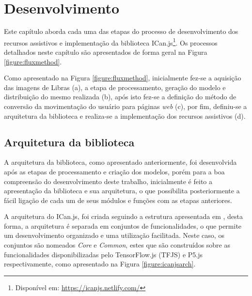 \newpage
\chapter{Desenvolvimento}
\label{ch:desenvolvimento}

\par Este capítulo aborda cada uma das etapas do processo de desenvolvimento dos recursos assistivos e implementação da biblioteca ICan.js\footnote{Disponível em: \url{https://icanjs.netlify.com/}}. Os processos detalhados neste capítulo são apresentados de forma geral na Figura \ref{figure:fluxmethod}.


\par Como apresentado na Figura \ref{figure:fluxmethod}, inicialmente fez-se a aquisição das imagens de Libras (a), a etapa de processamento, geração do modelo e distribuição do mesmo realizada (b), após isto fez-se a definição do método de conversão da movimentação do usuário para páginas \textit{web} (c), por fim, definiu-se a arquitetura da biblioteca e realiza-se a implementação dos recursos assistivos (d).

\section{Arquitetura da biblioteca}

\par A arquitetura da biblioteca, como apresentado anteriormente, foi desenvolvida após as etapas de processamento e criação dos modelos, porém para a boa compreensão do desenvolvimento deste trabalho, inicialmente é feito a apresentação da biblioteca e sua arquitetura, o que possibilita posteriormente a fácil ligação de cada um de seus módulos e funções com as etapas anteriores. 

\par A arquitetura do ICan.js, foi criada seguindo a estrutura apresentada em \cite{tensorflowjs2019}, desta forma, a arquitetura é separada em conjuntos de funcionalidades, o que permite um desenvolvimento organizado e uma utilização facilitada. Neste caso, os conjuntos são nomeados \textit{Core} e \textit{Common}, estes que são construídos sobre as funcionalidades disponibilizadas pelo TensorFlow.js (TFJS) e P5.js respectivamente, como apresentado na Figura \ref{figure:icanjsarch}.

